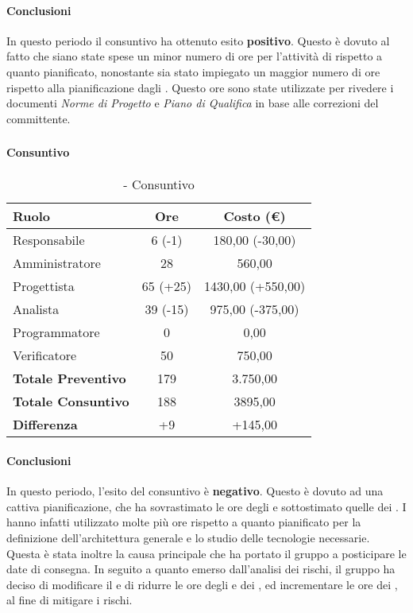 \documentclass[./PianoDiProgetto.tex]{subfiles}
\begin{document}
	\paragraph{Conclusioni}
	In questo periodo il consuntivo ha ottenuto esito \textbf{positivo}. Questo è dovuto al fatto che siano state spese un minor numero di ore  per l'attività di  rispetto a quanto pianificato, nonostante sia stato impiegato un maggior numero di ore rispetto alla pianificazione dagli \AMMP{}. Questo ore sono state utilizzate per rivedere i documenti \textit{Norme di Progetto} e \textit{Piano di Qualifica} in base alle correzioni del committente.

\subsubsection{\PerPA}
\paragraph{Consuntivo}
	\begin{table}[h]
		\centering
		\begin{tabular}{l * {2}{c}}
			\toprule
			\textbf{Ruolo} & \textbf{Ore} & \textbf{Costo (\euro{})} \\
			\midrule
			Responsabile &	6 (-1) & 180,00 (-30,00) \\
			Amministratore & 28 & 560,00\\
			Progettista & 65 (+25) & 1430,00 (+550,00)\\
			Analista & 39 (-15)  & 975,00 (-375,00)\\
			Programmatore & 0 & 0,00 \\
			Verificatore & 50 & 750,00\\
			\midrule
			\textbf{Totale Preventivo} & 179
 & 3.750,00
 \\
			\textbf{Totale Consuntivo} & 188 & 3895,00
 \\
			\midrule
			\textbf{Differenza} & +9 & +145,00 \\
			\bottomrule
		\end{tabular}
		\caption{\PerPA{} - Consuntivo}
	\end{table}
	\paragraph{Conclusioni}
			In questo periodo, l'esito del consuntivo è \textbf{negativo}. Questo è dovuto ad una cattiva pianificazione, che ha sovrastimato le ore degli \ANP{} e sottostimato quelle dei \PJP{}. I \PJP{} hanno infatti utilizzato molte più ore rispetto a quanto pianificato per la definizione dell'architettura generale e lo studio delle tecnologie necessarie. Questa è stata inoltre la causa principale che ha portato il gruppo a posticipare le date di consegna. In seguito a quanto emerso dall'analisi dei rischi, il gruppo ha deciso di modificare il \PPdocRP{} e di ridurre le ore degli \ANP{} e dei \VERP{}, ed incrementare le ore dei \PJP, al fine di mitigare i rischi.
\end{document}
